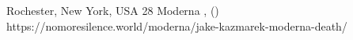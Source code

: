           {Rochester, New York, USA}
          {28}
          {Moderna}
          {, }
          {
             ()
          }
          {https://nomoresilence.world/moderna/jake-kazmarek-moderna-death/}


